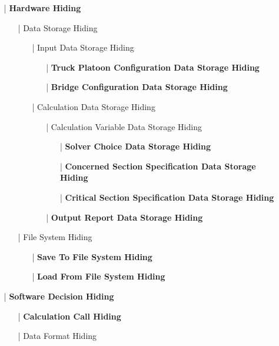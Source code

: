 \documentclass[12pt, titlepage]{article}
\begin{document}
\begin{enumerate}
    \item[|] \textbf{Hardware Hiding}
    \begin{enumerate}
        \item[|] Data Storage Hiding
        \begin{enumerate}
            \item[|] Input Data Storage Hiding
            \begin{enumerate}
                \item[|] \textbf{Truck Platoon Configuration Data Storage Hiding}
                \item[|] \textbf{Bridge Configuration Data Storage Hiding}
            \end{enumerate}
            \item[|] Calculation Data Storage Hiding
            \begin{enumerate}
                \item[|] Calculation Variable Data Storage Hiding
                \begin{itemize}
                    \item[|] \textbf{Solver Choice Data Storage Hiding}
                    \item[|] \textbf{Concerned Section Specification Data Storage Hiding}
                    \item[|] \textbf{Critical Section Specification Data Storage Hiding}
                \end{itemize}
                \item[|] \textbf{Output Report Data Storage Hiding}
            \end{enumerate}
        \end{enumerate}
        \item[|] File System Hiding
        \begin{enumerate}
            \item[|] \textbf{Save To File System Hiding}
            \item[|] \textbf{Load From File System Hiding} 
        \end{enumerate}
    \end{enumerate}
    \item[|] \textbf{Software Decision Hiding}
    \begin{enumerate}
        \item[|] \textbf{Calculation Call Hiding}
        \item[|] Data Format Hiding

\end{enumerate}
\end{enumerate}
\end{document}
